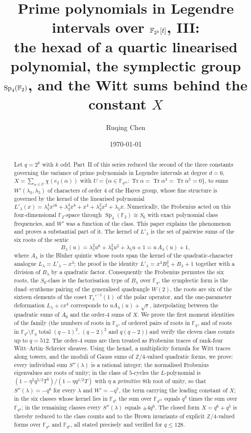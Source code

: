 ﻿\documentclass[12pt,a4paper]{amsart}
\title[Legendre intervals in even characteristic, III]{Prime polynomials in Legendre intervals over \texorpdfstring{$\F_{2^k}[t]$}{F(2k)[t]}, III:\texorpdfstring{\\}{ }the hexad of a quartic linearised polynomial, the symplectic group \texorpdfstring{$\Sp_4(\F_2)$}{Sp4(F2)}, and the Witt sums behind the constant \texorpdfstring{$X$}{X}}
\author{Ruqing Chen}
\date{\today}
\theoremstyle{definition}
\newcommand{\F}{\mathbb{F}}
\newcommand{\Z}{\mathbb{Z}}
\newcommand{\Tr}{\operatorname{Tr}}
\newcommand{\Sp}{\operatorname{Sp}}
\newcommand{\eps}{\varepsilon}
\newcommand{\Spp}{S''}
\begin{document}
\begin{abstract}
Let $q=2^k$ with $k$ odd. Part~II of this series reduced the second of the three constants governing the variance of prime polynomials in Legendre intervals at degree $d=6$, $X=\sum_{\alpha\in U}\chi(e_2(\alpha))$ with $U=\{\alpha\in\F_{q^{12}}:\Tr\alpha=\Tr\alpha^3=\Tr\alpha^5=0\}$, to sums $W'(\lambda_3,\lambda_5)$ of characters of order $4$ of the Hayes group, whose fine structure is governed by the kernel of the linearised polynomial $L'_\lambda(x)=\lambda_5^4x^{16}+\lambda_3^4x^8+x^4+\lambda_3^2x^2+\lambda_5x$. Numerically, the Frobenius acted on this four-dimensional $\F_2$-space through $\Sp_4(\F_2)\cong S_6$ with exact polynomial class frequencies, and $W'$ was a function of the class. This paper explains the phenomenon and proves a substantial part of it. The kernel of $L'_\lambda$ is the set of pairwise sums of the six roots of the sextic
\[
B_\lambda(u)=\lambda_5^2u^6+\lambda_3^2u^2+\lambda_5u+1=u\,A_\lambda(u)+1,
\]
where $A_\lambda$ is the Bluher quintic whose roots span the kernel of the quadratic-character analogue $L_\lambda=L'_\lambda-x^4$; the proof is the identity $L'_\lambda=x^4B_\lambda^2+B_\lambda+1$ together with a division of $B_\lambda$ by a quadratic factor. Consequently the Frobenius permutes the six roots, the $S_6$-class is the factorisation type of $B_\lambda$ over $\F_q$, the symplectic form is the duad--syntheme pairing of the generalised quadrangle $W(2)$, the roots are six of the sixteen elements of the coset $T_\lambda'^{-1}(1)$ of the polar operator, and the one-parameter deformation $L_\lambda+\eps x^4$ corresponds to $uA_\lambda(u)+\sqrt\eps$, interpolating between the quadratic sums of $A_6$ and the order-$4$ sums of $X$. We prove the first moment identities of the family (the numbers of roots in $\F_q$, of ordered pairs of roots in $\F_q$, and of roots in $\F_{q^2}\setminus\F_q$ total $(q-1)^2$, $(q-2)^2$ and $q(q-2)$) and verify the eleven class counts up to $q=512$. The order-$4$ sums are then treated as Frobenius traces of rank-four Witt--Artin--Schreier sheaves. Using the hexad, a multiplicity formula for Witt traces along towers, and the moduli of Gauss sums of $\Z/4$-valued quadratic forms, we prove: every individual sum $\Spp(\lambda)$ is a rational integer; the normalised Frobenius eigenvalues are roots of unity; in the class of $5$-cycles the $L$-polynomial is $(1-\eta^5q^{5/2}T^5)/(1-\eta q^{1/2}T)$ with $\eta$ a \emph{primitive} $8$th root of unity, so that $\Spp(\lambda)=-q^6$ for every $\lambda$ and $W'=-q^7$, the term carrying the leading constant of $X$; in the six classes whose kernel lies in $\F_{q^4}$ the sum over $\F_{q^{12}}$ equals $q^4$ times the sum over $\F_{q^4}$; in the remaining classes every $\Spp(\lambda)$ equals $\pm4q^6$. The closed form $X=q^6+q^5$ is thereby reduced to the class counts and to the Brown invariants of explicit $\Z/4$-valued forms over $\F_{q^4}$ and $\F_{q^6}$, all stated precisely and verified for $q\le128$.
\end{abstract}
\end{document}
